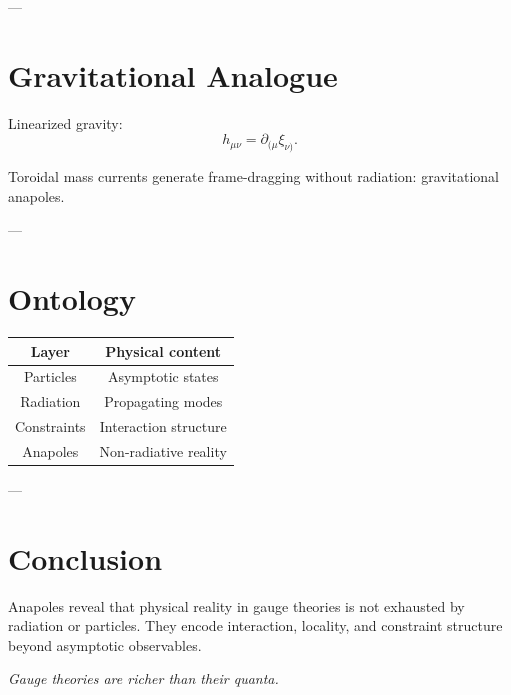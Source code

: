 \documentclass[11pt]{article}
\begin{document}
---

\section{Gravitational Analogue}

Linearized gravity:
\begin{equation}
h_{\mu\nu} = \partial_{(\mu}\xi_{\nu)}.
\end{equation}

Toroidal mass currents generate frame-dragging without radiation:
gravitational anapoles.

---

\section{Ontology}

\begin{center}
\begin{tabular}{c|c}
Layer & Physical content \\ \hline
Particles & Asymptotic states \\
Radiation & Propagating modes \\
Constraints & Interaction structure \\
Anapoles & Non-radiative reality
\end{tabular}
\end{center}

---

\section{Conclusion}

Anapoles reveal that physical reality in gauge theories is not exhausted by radiation or particles.
They encode interaction, locality, and constraint structure beyond asymptotic observables.

\bigskip
\begin{center}
\textit{Gauge theories are richer than their quanta.}
\end{center}
\end{document}
